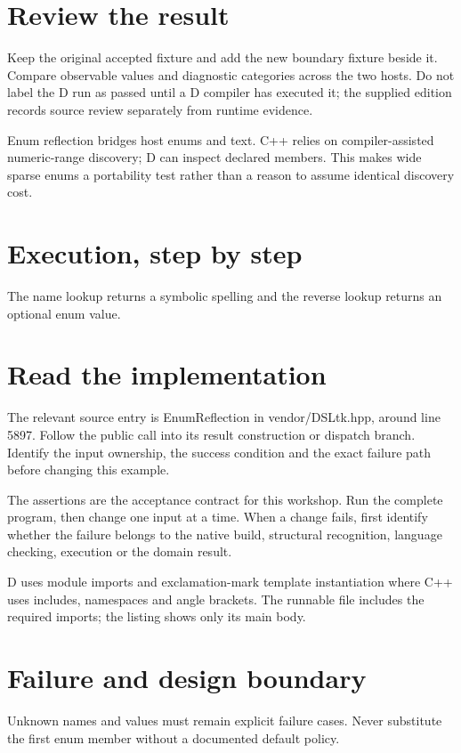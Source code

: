 \section*{Review the result}
Keep the original accepted fixture and add the new boundary fixture beside it. Compare observable values and diagnostic categories across the two hosts. Do not label the D run as passed until a D compiler has executed it; the supplied edition records source review separately from runtime evidence.

\clearpage
{}
Enum reflection bridges host enums and text. C++ relies on compiler-assisted numeric-range discovery; D can inspect declared members. This makes wide sparse enums a portability test rather than a reason to assume identical discovery cost.


\section*{Execution, step by step}
The name lookup returns a symbolic spelling and the reverse lookup returns an optional enum value.

\section*{Read the implementation}
The relevant source entry is EnumReflection in vendor/DSLtk.hpp, around line 5897. Follow the public call into its result construction or dispatch branch. Identify the input ownership, the success condition and the exact failure path before changing this example.

The assertions are the acceptance contract for this workshop. Run the complete program, then change one input at a time. When a change fails, first identify whether the failure belongs to the native build, structural recognition, language checking, execution or the domain result.

\clearpage
{}
D uses module imports and exclamation-mark template instantiation where C++ uses includes, namespaces and angle brackets. The runnable file includes the required imports; the listing shows only its main body.


\section*{Failure and design boundary}
Unknown names and values must remain explicit failure cases. Never substitute the first enum member without a documented default policy.

